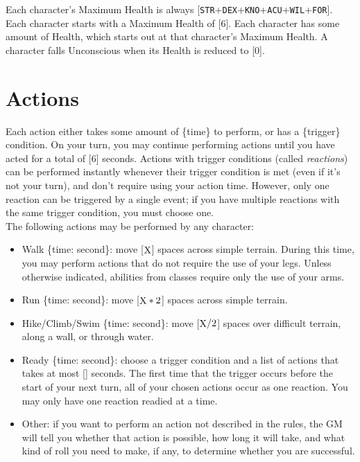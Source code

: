 \documentclass[12pt]{article}
\newcommand{\STR}{\texttt{STR}}
\newcommand{\DEX}{\texttt{DEX}}
\newcommand{\KNO}{\texttt{KNO}}
\newcommand{\ACU}{\texttt{ACU}}
\newcommand{\WIL}{\texttt{WIL}}
\newcommand{\FOR}{\texttt{FOR}}
\newcommand{\X}{\text{{\lower 0.2mm \hbox{X}}}}
\newcommand{\TIME}[1]{\{time: #1 second\if1#1{}\else{s}\fi\}}
\begin{document}
Each character's Maximum Health is always [\STR+\DEX+\KNO+\ACU+\WIL+\FOR]. Each character starts with a Maximum Health of [6].
Each character has some amount of Health, which starts out at that character's Maximum Health. A character falls Unconscious when its Health is reduced to [0].

\pagebreak
\section{Actions}

Each action either takes some amount of \{time\} to perform, or has a \{trigger\} condition. On your turn, you may continue performing actions until you have acted for a total of [6] seconds. Actions with trigger conditions (called \textit{reactions}) can be performed instantly whenever their trigger condition is met (even if it’s not your turn), and don’t require using your action time. However, only one reaction can be triggered by a single event; if you have multiple reactions with the same trigger condition, you must choose one.
\\[5mm]
The following actions may be performed by any character:
\begin{itemize}

\item Walk \TIME{\X}: move [$\X$] spaces across simple terrain. During this time, you may perform actions that do not require the use of your legs. Unless otherwise indicated, abilities from classes require only the use of your arms.

\item Run \TIME{\X}: move [$\X * 2$] spaces across simple terrain.

\item Hike/Climb/Swim \TIME{\X}: move [$\X / 2$] spaces over difficult terrain, along a wall, or through water.

\item Ready \TIME{\X}: choose a trigger condition and a list of actions that takes at most [\X] seconds. The first time that the trigger occurs before the start of your next turn, all of your chosen actions occur as one reaction. You may only have one reaction readied at a time.

\item Other: if you want to perform an action not described in the rules, the GM will tell you whether that action is possible, how long it will take, and what kind of roll you need to make, if any, to determine whether you are successful.

\end{itemize}
\end{document}
